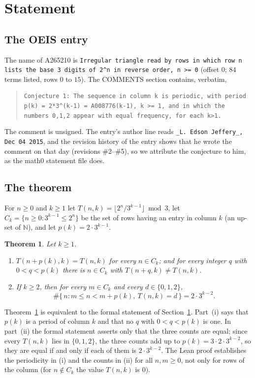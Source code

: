 \documentclass[11pt]{amsart}
\theoremstyle{plain}
\newtheorem{theorem}{Theorem}
\theoremstyle{definition}
\newcommand{\N}{\mathbb{N}}
\begin{document}
\section{Statement}\label{sec:statement}

\subsection{The OEIS entry}
The name of A265210 \cite{A265210} is \texttt{Irregular triangle read by rows in which row n lists the base 3 digits of 2\^{}n in reverse order, n >= 0} (offset $0$; $84$ terms listed, rows $0$ to $15$). The COMMENTS section contains, verbatim,
\begin{quote}
{\small\raggedright\texttt{Conjecture 1: The sequence in column k is periodic, with period p(k) = 2*3\^{}(k-1) = A008776(k-1), k >= 1, and in which the numbers 0,1,2 appear with equal frequency, for each k>1.}\par}
\end{quote}
The comment is unsigned. The entry's author line reads \texttt{\_L. Edson Jeffery\_, Dec 04 2015}, and the revision history of the entry shows that he wrote the comment on that day (revisions \#2--\#5), so we attribute the conjecture to him, as the math0 statement file does.

\subsection{The theorem}
For $n\ge0$ and $k\ge1$ let $T(n,k)=\lfloor 2^n/3^{k-1}\rfloor \bmod 3$, let $C_k=\{n\ge0: 3^{k-1}\le 2^n\}$ be the set of rows having an entry in column $k$ (an up-set of $\N$), and let $p(k)=2\cdot3^{k-1}$.

\begin{theorem}\label{thm:main}
Let $k\ge1$.
\begin{enumerate}
\item[(i)] $T(n+p(k),k)=T(n,k)$ for every $n\in C_k$; and for every integer $q$ with $0<q<p(k)$ there is $n\in C_k$ with $T(n+q,k)\ne T(n,k)$.
\item[(ii)] If $k\ge2$, then for every $m\in C_k$ and every $d\in\{0,1,2\}$,
\[
  \#\{\,n : m\le n< m+p(k),\ T(n,k)=d\,\}=2\cdot3^{k-2}.
\]
\end{enumerate}
\end{theorem}

Theorem~\ref{thm:main} is equivalent to the formal statement of Section~\ref{sec:statement}. Part~(i) says that $p(k)$ is a period of column $k$ and that no $q$ with $0<q<p(k)$ is one. In part~(ii) the formal statement asserts only that the three counts are equal; since every $T(n,k)$ lies in $\{0,1,2\}$, the three counts add up to $p(k)=3\cdot2\cdot3^{k-2}$, so they are equal if and only if each of them is $2\cdot3^{k-2}$.
The Lean proof establishes the periodicity in (i) and the counts in (ii) for all $n,m\ge0$, not only for rows of the column (for $n\notin C_k$ the value $T(n,k)$ is $0$).
\end{document}
